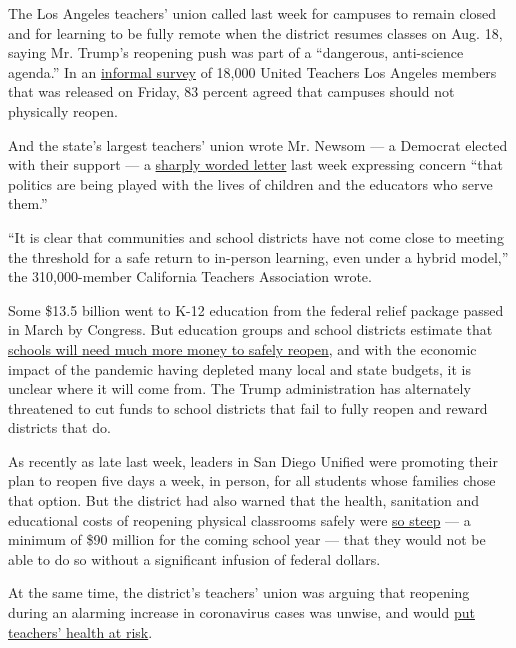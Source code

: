 The Los Angeles teachers' union called last week for campuses to remain
closed and for learning to be fully remote when the district resumes
classes on Aug. 18, saying Mr. Trump's reopening push was part of a
``dangerous, anti-science agenda.'' In an
\href{https://www.utla.net/news/poll-results-83-utla-members-say-lausd-schools-should-not-physically-reopen-august-18}{informal
survey} of 18,000 United Teachers Los Angeles members that was released
on Friday, 83 percent agreed that campuses should not physically reopen.

And the state's largest teachers' union wrote Mr. Newsom --- a Democrat
elected with their support --- a
\href{http://image.cta-mailings.org/lib/fe8a1574766d017b7c/m/2/2167fb86-b25b-4ce3-9bc7-4248b105a80d.pdf?fbclid=IwAR2QqpANyH9HwsSJJjE1-1NyK_r8bxIcrqucygKKV1ehQ-i_JYCwt3kksZg}{sharply
worded letter} last week expressing concern ``that politics are being
played with the lives of children and the educators who serve them.''

``It is clear that communities and school districts have not come close
to meeting the threshold for a safe return to in-person learning, even
under a hybrid model,'' the 310,000-member California Teachers
Association wrote.

Some \$13.5 billion went to K-12 education from the federal relief
package passed in March by Congress. But education groups and school
districts estimate that
\href{https://www.nytimes.com/2020/07/09/us/schools-reopening-trump.html}{schools
will need much more money to safely reopen}, and with the economic
impact of the pandemic having depleted many local and state budgets, it
is unclear where it will come from. The Trump administration has
alternately threatened to cut funds to school districts that fail to
fully reopen and reward districts that do.

As recently as late last week, leaders in San Diego Unified were
promoting their plan to reopen five days a week, in person, for all
students whose families chose that option. But the district had also
warned that the health, sanitation and educational costs of reopening
physical classrooms safely were
\href{https://www.nytimes.com/2020/07/09/us/schools-reopening-trump.html}{so
steep} --- a minimum of \$90 million for the coming school year --- that
they would not be able to do so without a significant infusion of
federal dollars.

At the same time, the district's teachers' union was arguing that
reopening during an alarming increase in coronavirus cases was unwise,
and would
\href{https://www.nytimes.com/2020/07/11/us/virus-teachers-classrooms.html}{put
teachers' health at risk}.

